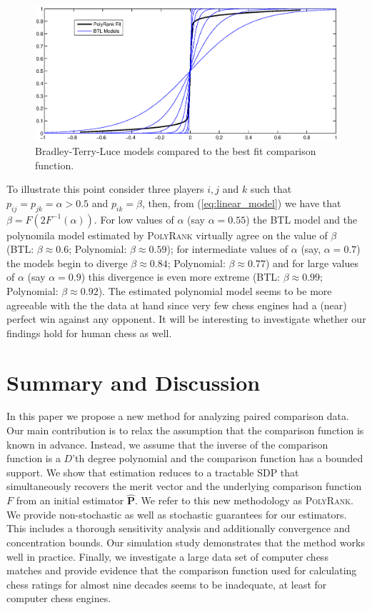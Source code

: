 \documentclass[twoside,11pt]{article}
\begin{document}
\begin{figure}
  \centering
    \includegraphics[width=1\textwidth]{PolyRank_vs_BTL_models.eps}
    \caption{Bradley-Terry-Luce models compared to the best fit comparison function. \label{fig:polyrank_vs_BTL}}
\end{figure}

To illustrate this point consider three players $i,j$ and $k$ such that $p_{ij} = p_{jk} = \alpha>0.5$ and $p_{ik} = \beta$, then, from (\ref{eq:linear_model}) we have that $\beta = F(2F^{-1}( \alpha))$. For low values of $ \alpha$ (say $ \alpha = 0.55$) the BTL model and the polynomila model estimated by \textsc{PolyRank} virtually agree on the value of $\beta$ (BTL: $\beta \approx 0.6$; Polynomial: $\beta \approx 0.59$); for intermediate values of $\alpha$ (say, $\alpha = 0.7$) the models begin to diverge $\beta\approx 0.84$; Polynomial: $\beta\approx 0.77$) and for large values of $ \alpha$ (say $ \alpha = 0.9$) this divergence is even more extreme (BTL: $\beta\approx 0.99$; Polynomial: $\beta\approx 0.92$). The estimated polynomial model seems to be more agreeable with the the data at hand since very few chess engines had a (near) perfect win against any opponent.  It will be interesting to investigate whether our findings hold for human chess as well.

\newpage
\section{Summary and Discussion}
\label{sec:discussions}

In this paper we propose a new method for analyzing paired comparison data. Our main contribution is to relax the assumption that the comparison function is known in advance. Instead, we assume that the inverse of the comparison function is a $D$'th degree polynomial and the comparison function has a bounded support. We show that estimation reduces to a tractable SDP that simultaneously recovers the merit vector and the underlying comparison function $F$ from  an initial estimator $\boldsymbol{\hat P}$. We refer to this new methodology as \textsc{PolyRank}. We provide non-stochastic as well as stochastic guarantees for our estimators. This includes a thorough sensitivity analysis and additionally convergence and concentration bounds. Our simulation study demonstrates that the method works well in practice. Finally, we investigate a large data set of computer chess matches and provide evidence that the comparison function used for calculating chess ratings for almost nine decades seems to be inadequate, at least for computer chess engines.
\end{document}
